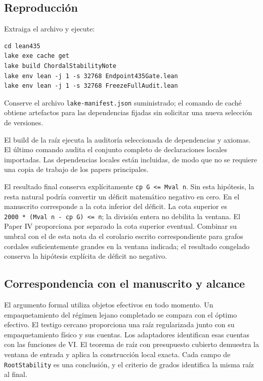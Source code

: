 \documentclass[spanish,11pt,a4paper]{article}
\begin{document}
\subsection{Reproducción}\label{reproducciuxf3n}

Extraiga el archivo y ejecute:

\begin{verbatim}
cd lean435
lake exe cache get
lake build ChordalStabilityNote
lake env lean -j 1 -s 32768 Endpoint435Gate.lean
lake env lean -j 1 -s 32768 FreezeFullAudit.lean
\end{verbatim}

Conserve el archivo \nolinkurl{lake-manifest.json} suministrado; el comando
de caché obtiene artefactos para las dependencias fijadas sin solicitar
una nueva selección de versiones.

El build de la raíz ejecuta la auditoría seleccionada de dependencias y
axiomas. El último comando audita el conjunto completo de declaraciones
locales importadas. Las dependencias locales están incluidas, de modo
que no se requiere una copia de trabajo de los papers principales.

El resultado final conserva explícitamente
\texttt{cp\ G\ \textless{}=\ Mval\ n}. Sin esta hipótesis, la resta
natural podría convertir un déficit matemático negativo en cero. En el
manuscrito corresponde a la cota inferior del déficit. La cota superior
es \texttt{2000\ *\ (Mval\ n\ -\ cp\ G)\ \textless{}=\ n}; la división
entera no debilita la ventana. El Paper IV proporciona por separado la
cota superior eventual. Combinar su umbral con el de esta nota da el
corolario escrito correspondiente para grafos cordales suficientemente
grandes en la ventana indicada; el resultado congelado conserva la
hipótesis explícita de déficit no negativo.

\subsection{Correspondencia con el manuscrito y
alcance}\label{correspondencia-con-el-manuscrito-y-alcance}

El argumento formal utiliza objetos efectivos en todo momento. Un
empaquetamiento del régimen lejano completado se compara con el óptimo
efectivo. El testigo cercano proporciona una raíz regularizada junto con
su empaquetamiento físico y sus cuentas. Los adaptadores identifican
esas cuentas con las funciones de VI. El teorema de raíz con presupuesto
cubierto demuestra la ventana de entrada y aplica la construcción local
exacta. Cada campo de \nolinkurl{RootStability} es una conclusión, y el
criterio de grados identifica la misma raíz al final.
\end{document}
